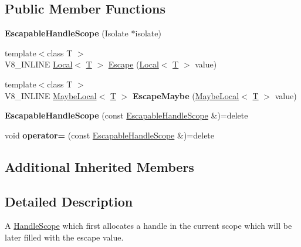 \subsection*{Public Member Functions}
\begin{DoxyCompactItemize}
\item 
\mbox{\label{classv8_1_1EscapableHandleScope_aea39a7fd4dee6da31f3921ff891e1731}} 
{\bfseries Escapable\+Handle\+Scope} (Isolate $\ast$isolate)
\item 
{\footnotesize template$<$class T $>$ }\\V8\+\_\+\+I\+N\+L\+I\+NE \mbox{\hyperlink{classv8_1_1Local}{Local}}$<$ \mbox{\hyperlink{classv8_1_1internal_1_1torque_1_1T}{T}} $>$ \mbox{\hyperlink{classv8_1_1EscapableHandleScope_afdf0d3850978f65d1a827f78b3a2b6fd}{Escape}} (\mbox{\hyperlink{classv8_1_1Local}{Local}}$<$ \mbox{\hyperlink{classv8_1_1internal_1_1torque_1_1T}{T}} $>$ value)
\item 
\mbox{\label{classv8_1_1EscapableHandleScope_a7e0ca63c86c3f0cbc87784f601cf4ad5}} 
{\footnotesize template$<$class T $>$ }\\V8\+\_\+\+I\+N\+L\+I\+NE \mbox{\hyperlink{classv8_1_1MaybeLocal}{Maybe\+Local}}$<$ \mbox{\hyperlink{classv8_1_1internal_1_1torque_1_1T}{T}} $>$ {\bfseries Escape\+Maybe} (\mbox{\hyperlink{classv8_1_1MaybeLocal}{Maybe\+Local}}$<$ \mbox{\hyperlink{classv8_1_1internal_1_1torque_1_1T}{T}} $>$ value)
\item 
\mbox{\label{classv8_1_1EscapableHandleScope_a1a50d87127787da65c679a361fc8967d}} 
{\bfseries Escapable\+Handle\+Scope} (const \mbox{\hyperlink{classv8_1_1EscapableHandleScope}{Escapable\+Handle\+Scope}} \&)=delete
\item 
\mbox{\label{classv8_1_1EscapableHandleScope_a95b116173bfb5a478068caa0ff275999}} 
void {\bfseries operator=} (const \mbox{\hyperlink{classv8_1_1EscapableHandleScope}{Escapable\+Handle\+Scope}} \&)=delete
\end{DoxyCompactItemize}
\subsection*{Additional Inherited Members}


\subsection{Detailed Description}
A \mbox{\hyperlink{classv8_1_1HandleScope}{Handle\+Scope}} which first allocates a handle in the current scope which will be later filled with the escape value. 

